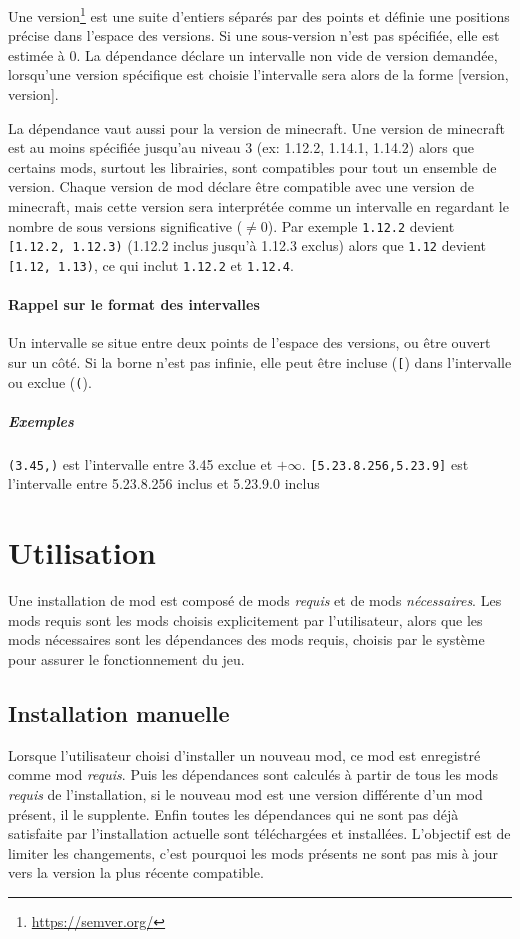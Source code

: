 \documentclass{article}
\begin{document}
Une version\footnote{\url{https://semver.org/}} est une suite d'entiers séparés par des points et définie une positions précise dans l'espace des versions.
Si une sous-version n'est pas spécifiée, elle est estimée à 0.
La dépendance déclare un intervalle non vide de version demandée, lorsqu'une version spécifique est choisie l'intervalle sera alors de la forme [version, version].

La dépendance vaut aussi pour la version de minecraft.
Une version de minecraft est au moins spécifiée jusqu'au niveau 3 (ex: 1.12.2, 1.14.1, 1.14.2) alors que certains mods, surtout les librairies, sont compatibles pour tout un ensemble de version.
Chaque version de mod déclare être compatible avec une version de minecraft, mais cette version sera interprétée comme un intervalle en regardant le nombre de sous versions significative ($\neq 0$).
Par exemple \verb|1.12.2| devient \verb|[1.12.2, 1.12.3)| (1.12.2 inclus jusqu'à 1.12.3 exclus) alors que \verb|1.12| devient \verb|[1.12, 1.13)|, ce qui inclut \verb|1.12.2| et \verb|1.12.4|.

\paragraph{Rappel sur le format des intervalles}
Un intervalle se situe entre deux points de l'espace des versions, ou être ouvert sur un côté.
Si la borne n'est pas infinie, elle peut être incluse (\verb|[|) dans l'intervalle ou exclue (\verb|(|).
\subparagraph{Exemples}
\verb|(3.45,)| est l'intervalle entre 3.45 exclue et $+\infty$.
\verb|[5.23.8.256,5.23.9]| est l'intervalle entre 5.23.8.256 inclus et 5.23.9.0 inclus

%
%
\section{Utilisation}
\label{section:utilisation}
Une installation de mod est composé de mods \textit{requis} et de mods \textit{nécessaires}.
Les mods requis sont les mods choisis explicitement par l'utilisateur, alors que les mods nécessaires sont les dépendances des mods requis, choisis par le système pour assurer le fonctionnement du jeu.

\subsection{Installation manuelle}
\label{section:utilisation.manuelle}
Lorsque l'utilisateur choisi d'installer un nouveau mod, ce mod est enregistré comme mod \textit{requis}.
Puis les dépendances sont calculés à partir de tous les mods \textit{requis} de l'installation, si le nouveau mod est une version différente d'un mod présent, il le supplente.
Enfin toutes les dépendances qui ne sont pas déjà satisfaite par l'installation actuelle sont téléchargées et installées.
L'objectif est de limiter les changements, c'est pourquoi les mods présents ne sont pas mis à jour vers la version la plus récente compatible.
\end{document}
